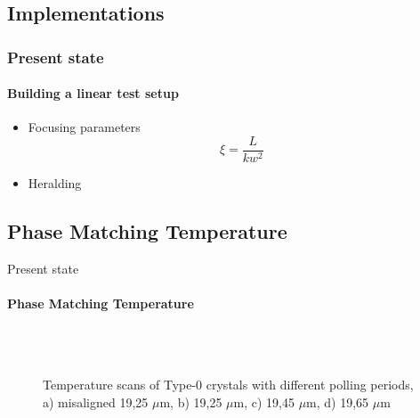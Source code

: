 \documentclass[serif,8pt]{beamer}
\begin{document}
{{\subsection{Implementations}
\begin{frame}[t]
	\frametitle{Present state}
	\framesubtitle{Building a linear test setup}
		\begin{itemize}
			\item Focusing parameters
					\begin{equation}
							\xi = \frac{L}{k w^2}
						\label{eq:Focusing parameter}
					\end{equation}
			\item Heralding
		\end{itemize}

\end{frame}

\subsection{Phase Matching Temperature}
\begin{frame}{Present state}
	\framesubtitle{Phase Matching Temperature}
	\begin{figure}[!ht]
	  \centering
	  \caption{Temperature scans of Type-0 crystals with different polling periods, a) misaligned 19,25 $\mu$m, b) 19,25 $\mu$m, c) 19,45 $\mu$m, d) 19,65 $\mu$m}
	  \quad
	  \pause
	  \\
	  \quad
	  \\
	  \label{fig:sub2}
	\end{figure}
\end{frame}

}}
\end{document}
